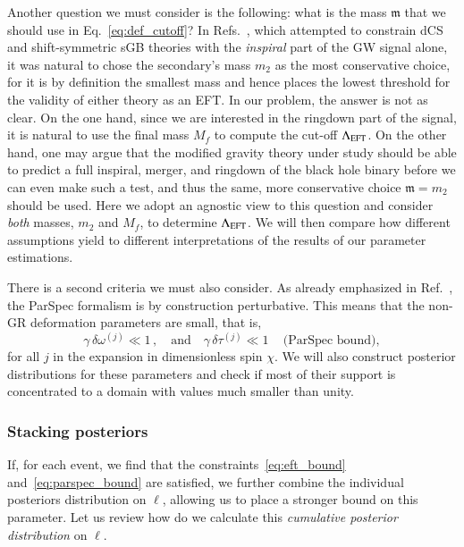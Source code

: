 \documentclass[twocolumn,
               prd,
               aps,
               superscriptaddress,
               tightenlines,
               nofootinbib,
               eqsecnum,
               amsfonts,
               amsmath,
               longbibliography]{revtex4-1}
\newcommand{\gm}{\mathfrak{m}}
\begin{document}
Another question we must consider is the following: what is the mass $\mathfrak{m}$ that we should use
in Eq.~\eqref{eq:def_cutoff}?
%
In Refs.~\cite{Nair:2019iur,Perkins:2021mhb,Lyu:2022gdr}, which attempted to
constrain dCS and shift-symmetric sGB theories with the \emph{inspiral} part of
the GW signal alone, it was natural to chose the secondary's mass $m_2$ as the most
conservative choice, for it is by definition the smallest mass and hence
places the lowest threshold for the validity of either theory as an EFT.
%
In our problem, the answer is not as clear. On the one hand, since we are
interested in the ringdown part of the signal, it is natural to use the
final mass $M_f$ to compute the cut-off $\Lambda_{\rm EFT}$.
%
On the other hand, one may argue that the modified gravity theory under study
should be able to predict a full inspiral, merger, and ringdown of the black
hole binary before we can even make such a test, and thus the same, more conservative choice
$\gm = m_2$ should be used.
%
Here we adopt an agnostic view to this question and consider \emph{both} masses, $m_2$ and $M_f$, to
determine $\Lambda_{\rm EFT}$. We will then compare how different assumptions
yield to different interpretations of the results of our parameter estimations.

There is a second criteria we must also consider.
%
As already emphasized in Ref.~\cite{Maselli:2019mjd}, the {\sc ParSpec}
formalism is by construction perturbative. This means that the non-GR
deformation parameters are small, that is,
%
\begin{equation}
\gamma \, \delta \omega^{(j)} \ll 1 \,,
\quad \textrm{and} \quad
\gamma \, \delta \tau^{(j)} \ll 1 \, \quad \textrm{(ParSpec bound)},
\label{eq:parspec_bound}
\end{equation}
%
for all $j$ in the expansion in dimensionless spin $\chi$.
%
We will also construct posterior distributions for these parameters and check if
most of their support is concentrated to a domain with values much smaller than
unity.

\subsubsection{Stacking posteriors}
\label{sec:stack}

If, for each event, we find that the constraints~\eqref{eq:eft_bound}
and~\eqref{eq:parspec_bound} are satisfied, we further combine the individual
posteriors distribution on $\ell$, allowing us to place a stronger bound on this parameter.
%
Let us review how do we calculate this \emph{cumulative posterior distribution} on $\ell$.
\end{document}
